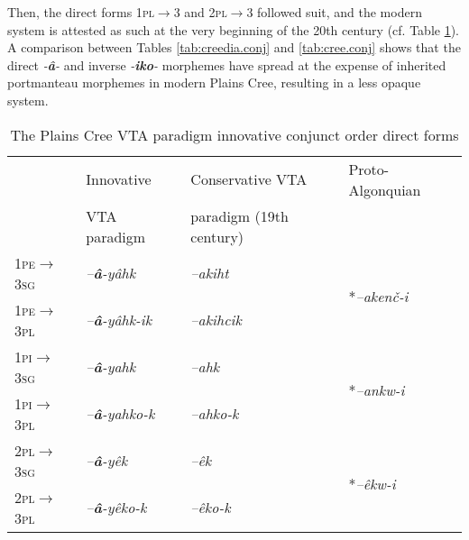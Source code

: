 \documentclass[twoside,a4paper,11pt]{article}
\newcommand{\ipa}[1]{{\phon\textit{#1}}}
\newcommand{\sg}{\textsc{sg}}
\newcommand{\pl}{\textsc{pl}}
\newcommand{\grise}[1]{\cellcolor{lightgray}\textbf{#1}}
\newcommand{\pli}{\textsc{pi}}
\newcommand{\pe}{\textsc{pe}}
\begin{document}
Then, the direct forms 1\pl$\rightarrow$3 and 2\pl$\rightarrow$3 followed suit, and the modern system is attested as such at the very beginning of the 20th century (cf. Table \ref{tab:cree.vta.innov.dir}). A comparison between Tables \ref{tab:creedia.conj} and \ref{tab:cree.conj} shows that the direct \ipa{-\textbf{â}-} and inverse \ipa{-\textbf{iko}-} morphemes have spread at the expense of inherited portmanteau morphemes in modern Plains Cree, resulting in a less opaque system.

\begin{table}[H]
\caption{The Plains Cree VTA paradigm innovative conjunct order direct forms}
\centering \label{tab:cree.vta.innov.dir}
\begin{tabular}{llll}
\toprule
& Innovative & Conservative VTA & Proto-Algonquian \\
& VTA paradigm & paradigm (19th century) &\\
\midrule
1\pe$\rightarrow$3\sg & 	\ipa{--\textbf{â}-yâhk} \grise{}& 	\ipa{--akiht} & \multirow{2}{*}{*\ipa{--akenč-i}} \\
1\pe$\rightarrow$3\pl & 	\ipa{--\textbf{â}-yâhk-ik} \grise{}& 	\ipa{--akihcik} \grise{} & \multirow{-2}{*}{}\\
1\pli$\rightarrow$3\sg & 	\ipa{--\textbf{â}-yahk} \grise{}& 	\ipa{--ahk}  &\multirow{2}{*}{*\ipa{--ankw-i}} \\
1\pli$\rightarrow$3\pl & 	\ipa{--\textbf{â}-yahko-k} \grise{}& 	\ipa{--ahko-k} \grise{} & \multirow{-2}{*}{} \\
\midrule
2\pl$\rightarrow$3\sg & \ipa{--\textbf{â}-yêk} \grise{} & \ipa{--êk} &\multirow{2}{*}{*\ipa{--êkw-i}}\\
2\pl$\rightarrow$3\pl & \ipa{--\textbf{â}-yêko-k} \grise{} & \ipa{--êko-k}\grise{} & \multirow{-2}{*}{}\\
\bottomrule
\end{tabular}
\end{table}
\end{document}
